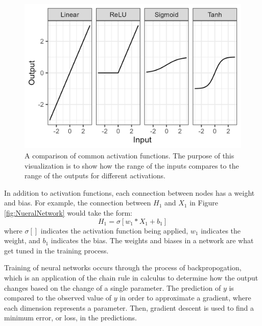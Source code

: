 \begin{figure}[ht]
    \centering
    \includegraphics[width=0.8\linewidth]{"Figures/Activations.png"}
    \caption{A comparison of common activation functions. The purpose of this visualization is to show how the range of the inputs compares to the range of the outputs for different activations.}
    \label{fig:Activations}
\end{figure}

In addition to activation functions, each connection between nodes has a weight and bias. For example, the connection between $H_1$ and $X_1$ in Figure \ref{fig:NueralNetwork} would take the form:
\begin{equation*}
    H_1 = \sigma[w_1*X_1 + b_1]
\end{equation*}
where $\sigma[]$ indicates the activation function being applied, $w_1$ indicates the weight, and $b_1$ indicates the bias. The weights and biases in a network are what get tuned in the training process.

Training of neural networks occurs through the process of backpropogation, which is an application of the chain rule in calculus to determine how the output changes based on the change of a single parameter. The prediction of $y$ is compared to the observed value of $y$ in order to approximate a gradient, where each dimension represents a parameter. Then, gradient descent is used to find a minimum error, or loss, in the predictions.